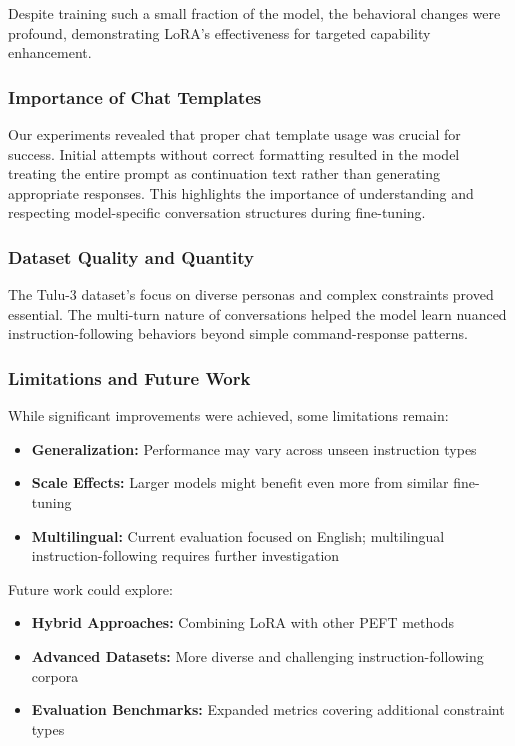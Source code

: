 Despite training such a small fraction of the model, the behavioral changes were profound, demonstrating LoRA's effectiveness for targeted capability enhancement.

\subsubsection{Importance of Chat Templates}
Our experiments revealed that proper chat template usage was crucial for success. Initial attempts without correct formatting resulted in the model treating the entire prompt as continuation text rather than generating appropriate responses. This highlights the importance of understanding and respecting model-specific conversation structures during fine-tuning.

\subsubsection{Dataset Quality and Quantity}
The Tulu-3 dataset's focus on diverse personas and complex constraints proved essential. The multi-turn nature of conversations helped the model learn nuanced instruction-following behaviors beyond simple command-response patterns.

\subsubsection{Limitations and Future Work}
While significant improvements were achieved, some limitations remain:
\begin{itemize}
    \item \textbf{Generalization:} Performance may vary across unseen instruction types
    \item \textbf{Scale Effects:} Larger models might benefit even more from similar fine-tuning
    \item \textbf{Multilingual:} Current evaluation focused on English; multilingual instruction-following requires further investigation
\end{itemize}

Future work could explore:
\begin{itemize}
    \item \textbf{Hybrid Approaches:} Combining LoRA with other PEFT methods
    \item \textbf{Advanced Datasets:} More diverse and challenging instruction-following corpora
    \item \textbf{Evaluation Benchmarks:} Expanded metrics covering additional constraint types
\end{itemize}

